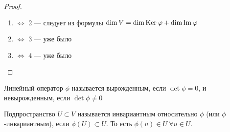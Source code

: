 \begin{proof}
    \ 
    \begin{enumerate}
        \item $\Leftrightarrow$ 2 --- следует из формулы $\dim V = \dim \mathrm{Ker}\: \varphi + \dim \mathrm{Im\:} \varphi$
        \item $\Leftrightarrow$ 3 --- уже было
        \item $\Leftrightarrow$ 4 --- уже было
    \end{enumerate}
\end{proof}
\begin{Def}
    Линейный оператор $\phi$ называется вырожденным, если $\det \phi = 0$, и невырожденным, если $\det \phi \neq 0$
\end{Def}
\begin{Def} 
    Подпространство $U \subset V$ называется инвариантным относительно $\phi$ (или $\phi$-инвариантным), если $\phi(U)\subset U$. То есть $\phi(u)\in U\ \forall u\in U$. 
\end{Def}

